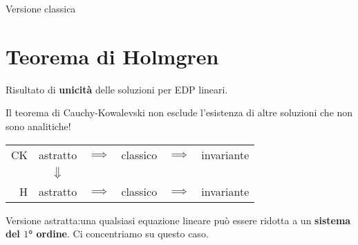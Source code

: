 Versione classica

\begin{theorem}
\vspace{-5mm}
\end{theorem}


\newpage
\section{Teorema di Holmgren}

Risultato di \textbf{unicità} delle soluzioni per EDP lineari.
\begin{remark}
Il teorema di Cauchy-Kowalevski non esclude l'esistenza di altre soluzioni che non sono analitiche!
\end{remark}


\renewcommand{\arraystretch}{1.5}
\begin{tabular}{r||ccccc} 
CK & astratto & $\implies$  & classico & $\implies$ & invariante\\
&$\big\Downarrow$ &&&&\\
H & astratto & $\implies$ & classico & $\implies$ & invariante\\
\end{tabular}


Versione astratta:una qualsiasi equazione lineare può essere ridotta a un \textbf{sistema del $1$° ordine}. Ci concentriamo su questo caso. 
\begin{theorem}
\end{theorem}

